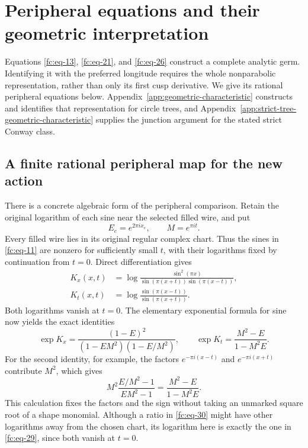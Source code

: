 \section{Peripheral equations and their geometric interpretation}\label{fc:sec-7}

Equations \eqref{fc:eq-13}, \eqref{fc:eq-21}, and \eqref{fc:eq-26} construct a complete analytic germ. Identifying it with the preferred longitude requires the whole nonparabolic representation, rather than only its first cusp derivative. We give its rational peripheral equations below. Appendix~\ref{app:geometric-characteristic} constructs and identifies that representation for circle trees, and Appendix~\ref{app:strict-tree-geometric-characteristic} supplies the junction argument for the stated strict Conway class.

\subsection{A finite rational peripheral map for the new action}\label{fc:sec-7-1}

There is a concrete algebraic form of the peripheral comparison. Retain the original logarithm of each sine near the selected filled wire, and put
\begin{equation}\label{fc:eq-28}
E_e=e^{2\pi i x_e},\qquad M=e^{\pi i t}.
\end{equation}
 Every filled wire lies in its original regular complex chart. Thus the sines in \eqref{fc:eq-11} are nonzero for sufficiently small \(t\), with their logarithms fixed by continuation from \(t=0\). Direct differentiation gives
\begin{equation}\label{fc:eq-29}
\begin{aligned}
 K_x(x,t)
 &=\log\frac{\sin^2(\pi x)}
                 {\sin(\pi(x+t))\sin(\pi(x-t))},\\
 K_t(x,t)
 &=\log\frac{\sin(\pi(x-t))}{\sin(\pi(x+t))}.
 \end{aligned}
\end{equation}
 Both logarithms vanish at \(t=0\). The elementary exponential formula for sine now yields the exact identities
\begin{equation}\label{fc:eq-30}
\exp K_x=
 \frac{(1-E)^2}{(1-EM^2)(1-E/M^2)},\qquad
 \exp K_t=\frac{M^2-E}{1-M^2E}.
\end{equation}
 For the second identity, for example, the factors \(e^{-\pi i(x-t)}\) and \(e^{-\pi i(x+t)}\) contribute \(M^2\), which gives \[
 M^2\frac{E/M^2-1}{EM^2-1}
                =\frac{M^2-E}{1-M^2E}.
\] This calculation fixes the factors and the sign without taking an unmarked square root of a shape monomial. Although a ratio in \eqref{fc:eq-30} might have other logarithms away from the chosen chart, its logarithm here is exactly the one in \eqref{fc:eq-29}, since both vanish at \(t=0\).

